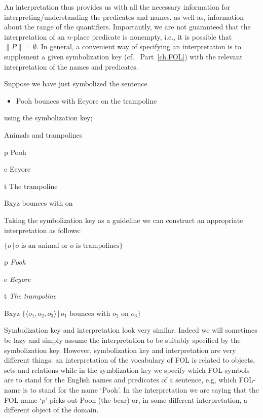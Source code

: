 An interpretation thus provides us with all the necessary information for interpreting/understanding the predicates and names, as well as, information about the range of the quantifiers. Importantly, we are not guaranteed that the interpretation of an $n$-place predicate is nonempty, i.e., it is possible that $\|P\|=\emptyset$. In general, a convenient way of specifying an interpretation is to supplement a given symbolization key (cf.~ Part~\ref{ch.FOL}) with the relevant interpretation of the names and predicates.

Suppose we have just symbolized the sentence
\begin{itemize}
\item Pooh bounces with Eeyore on the trampoline
\end{itemize}
using the symbolization key;
\begin{ekey}
\item[\text{domain}]Animals and trampolines
\item[p]Pooh
\item[e]Eeyore
\item[t]The trampoline
\item[Bxyz] bounces with  on 
\end{ekey}
Taking the symbolization key as a guideline we can construct an appropriate interpretation as follows:
\begin{ekey}
\item[\text{domain}]$\{o\,|\,o\text{ is an animal or }o\text{ is trampolines}\}$
\item[p]\emph{Pooh}
\item[e]\emph{Eeyore}
\item[t]\emph{The trampoline}
\item[Bxyz]$\{\langle o_1,o_2,o_3\rangle\,|\,o_1\text{ bounces with }o_2\text{ on }o_3\}$
\end{ekey}
Symbolization key and interpretation look very similar. Indeed we will sometimes be lazy and simply assume the interpretation to be suitably specified by the symbolization key. However, symbolization key and interpretation are very different things: an interpretation of the vocabulary of FOL is related to objects, sets and relations while in the symblization key we specify which FOL-symbols are to stand for the English names and predicates of a sentence, e.g, which FOL-name is to stand for the name `Pooh'. In the interpretation we are saying that the FOL-name `$p$' picks out Pooh (the bear) or, in some different interpretation, a different object of the domain. 

